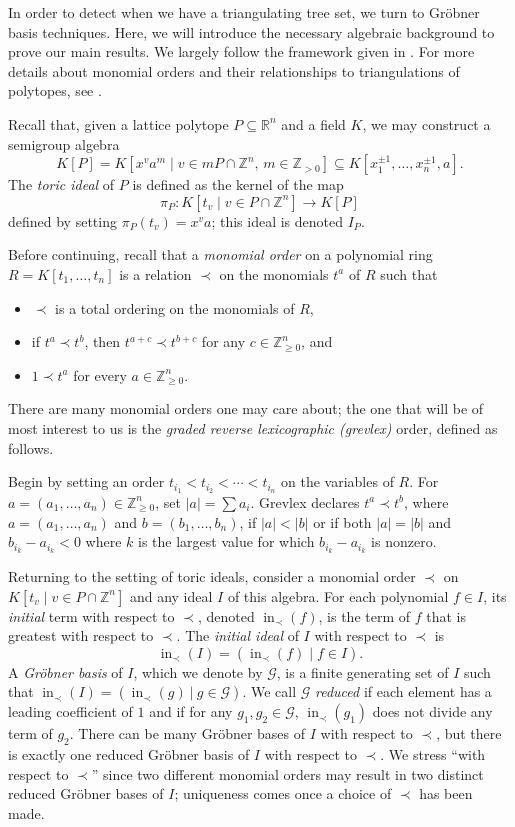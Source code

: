 \documentclass{amsart}
\numberwithin{equation}{section}
\theoremstyle{plain}
\theoremstyle{definition}
\DeclareMathOperator{\init}{in}
\newcommand{\RR}{\mathbb{R}}
\newcommand{\ZZ}{\mathbb{Z}}
\newcommand{\grob}{\mathscr{G}}
\begin{document}
In order to detect when we have a triangulating tree set, we turn to Gr\"obner basis techniques.
Here, we will introduce the necessary algebraic background to prove our main results. 
We largely follow the framework given in \cite{HJM}.
For more details about monomial orders and their relationships to triangulations of polytopes, see \cite[Chapter 8]{sturmfels}.

Recall that, given a lattice polytope $P \subseteq \RR^n$ and a field $K$, we may construct a semigroup algebra 
\[
    K[P] = K[x^va^m \mid v \in mP \cap \ZZ^n,\, m \in \ZZ_{>0}] \subseteq K[x_1^{\pm 1}, \dots, x_n^{\pm 1},a].
\]
The \emph{toric ideal} of $P$ is defined as the kernel of the map
\[
    \pi_P: K[t_v \mid v \in P \cap \ZZ^n] \to K[P]
\]
defined by setting $\pi_P(t_v) = x^va$; this ideal is denoted $I_P$.

Before continuing, recall that a \emph{monomial order} on a polynomial ring $R = K[t_1,\dots,t_n]$ is a relation $\prec$ on the monomials $t^a$ of $R$ such that
\begin{itemize}
    \item $\prec$ is a total ordering on the monomials of $R$,
    \item if $t^a \prec t^b$, then $t^{a+c} \prec t^{b+c}$ for any $c \in \ZZ_{\geq 0}^n$, and
    \item $1 \prec t^a$ for every $a \in \ZZ_{\geq 0}^n$.
\end{itemize}
There are many monomial orders one may care about; the one that will be of most interest to us is the \emph{graded reverse lexicographic (grevlex)} order, defined as follows.

Begin by setting an order $t_{i_1} < t_{i_2} < \cdots < t_{i_n}$ on the variables of $R$.
For $a = (a_1,\dots,a_n) \in \ZZ_{\geq 0}^n$, set $\left|a\right| = \sum a_i$.
Grevlex declares $t^a \prec t^b$, where $a = (a_1,\dots,a_n)$ and $b = (b_1,\dots,b_n)$, if $\left|a\right| < \left|b\right|$ or if both $\left|a\right| = \left|b\right|$ and $b_{i_k} - a_{i_k} < 0$ where $k$ is the largest value for which $b_{i_k} - a_{i_k}$ is nonzero.

Returning to the setting of toric ideals, consider a monomial order $\prec$ on $K[t_v \mid v \in P \cap \ZZ^n]$ and any ideal $I$ of this algebra.
For each polynomial $f \in I$, its \emph{initial} term with respect to $\prec$, denoted $\init_{\prec}(f)$, is the term of $f$ that is greatest with respect to $\prec$.
The \emph{initial ideal} of $I$ with respect to $\prec$ is 
\[
	\init_{\prec}(I) = ( \init_{\prec}(f) \mid f \in I).
\]
A \emph{Gr\"obner basis} of $I$, which we denote by $\grob$, is a finite generating set of $I$ such that $\init_{\prec}(I) = (\init_{\prec}(g)\ |\ g \in \grob)$.
We call $\grob$ \emph{reduced} if each element has a leading coefficient of $1$ and if for any $g_1, g_2 \in \grob$, $\init_{\prec}(g_1)$ does not divide any term of $g_2$.
There can be many Gr\"obner bases of $I$ with respect to $\prec$, but there is exactly one reduced Gr\"obner basis of $I$ with respect to $\prec$.
We stress ``with respect to $\prec$'' since two different monomial orders may result in two distinct reduced Gr\"obner bases of $I$; uniqueness comes once a choice of $\prec$ has been made.
\end{document}
